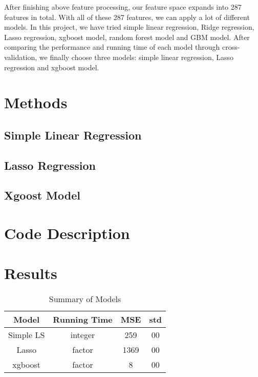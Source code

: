 \documentclass{article}
\begin{document}
After finishing above feature processing, our feature space expands into 287 features in total. With all of these 287 features, we can apply a lot of different models. In this project, we have tried simple linear regression, Ridge regression, Lasso regression, xgboost model, random forest model and GBM model. After comparing the performance and running time of each model through cross-validation, we finally choose three models: simple linear regression, Lasso regression and xgboost model.

\section{Methods}

\subsection{Simple Linear Regression}

\subsection{Lasso Regression}

\subsection{Xgoost Model}



\section{Code Description}


\section{Results}

\begin{table}[htb]
 \caption{Summary of Models} \label{result}
\begin{center}
  \begin{tabular}{  c  c c  c }
    \hline
    Model         & Running Time  & MSE     & std \\ \hline
    Simple LS   & integer            & 259      & 00 \\
    Lasso         & factor             & 1369    & 00\\
    xgboost      & factor            & 8          & 00\\

    \hline
  \end{tabular}
\end{center}
\end{table}
\end{document}
